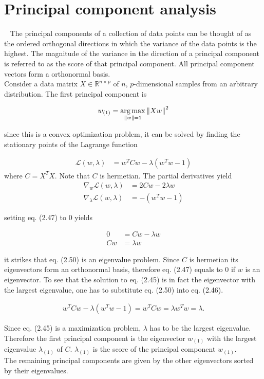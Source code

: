 \section{Principal component analysis}~\label{sec:pca}
The principal components of a collection of data points can be thought of as the ordered orthogonal directions in which the variance of the data points is the highest. The magnitude of the variance in the direction of a principal component is referred to as the score of that principal component. All principal component vectors form a orthonormal basis.\\
Consider a data matrix $X \in \mathbb{R}^{n\times p}$ of $n$, $p$-dimensional samples from an arbitrary distribution. The first principal component is

\begin{align}
	w_{(1)} = \operatorname*{arg\,max}_{\left\lVert w\right\rVert = 1} \left\lVert Xw\right\rVert^2
\end{align}

since this is a convex optimization problem, it can be solved by finding the stationary points of the Lagrange function

\begin{align}
	\mathcal{L}(w, \lambda) &= w^TCw - \lambda(w^Tw -1)
\end{align}
where $C = X^TX$. Note that $C$ is hermetian.
The partial derivatives yield	
\begin{align}
	\nabla_w \mathcal{L}(w, \lambda) &= 2Cw-2\lambda w \\
	\nabla_\lambda \mathcal{L}(w, \lambda) &= - (w^Tw -1)
\end{align}

setting eq. (2.47) to $0$ yields

\begin{align}
	0 &= Cw-\lambda w \\
	Cw &= \lambda w
\end{align}

it strikes that eq. (2.50) is an eigenvalue problem. Since $C$ is hermetian its eigenvectors form an orthonormal basis, therefore eq. (2.47) equals to $0$ if $w$ is an eigenvector. To see that the solution to eq. (2.45) is in fact the eigenvector with the largest eigenvalue, one has to substitute eq. (2.50) into eq. (2.46).

\begin{align}
	w^TCw - \lambda(w^Tw -1) = w^TCw = \lambda w^Tw = \lambda.
\end{align}

Since eq. (2.45) is a maximization problem, $\lambda$ has to be the largest eigenvalue.
Therefore the first principal component is the eigenvector $w_{(1)}$ with the largest eigenvalue $\lambda_{(1)}$ of $C$. $\lambda_{(1)}$ is the score of the principal component $w_{(1)}$. \\

The remaining principal components are given by the other eigenvectors sorted by their eigenvalues.
